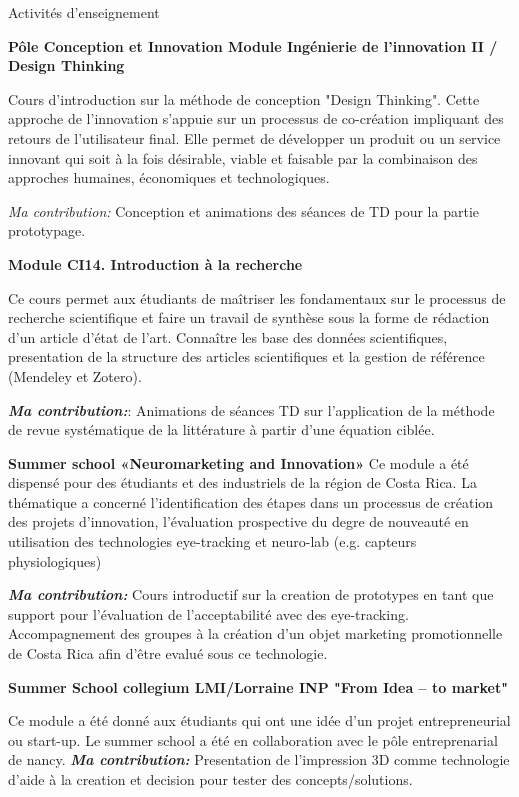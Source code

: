 \begin{rubric}{Activités d'enseignement}


\entry*[]\textbf{Pôle Conception et Innovation Module Ingénierie de l’innovation II / Design Thinking}

Cours d'introduction sur la méthode de conception "Design Thinking".  Cette approche de l'innovation s'appuie sur un processus de co-création impliquant des retours de l'utilisateur final.  Elle permet de développer un produit ou un service innovant qui soit à la fois désirable, viable et faisable par la combinaison des approches humaines, économiques et technologiques.

 \textit{Ma contribution:} Conception et animations des séances de TD pour la partie prototypage.

\entry*[]\textbf{Module CI14. Introduction à la recherche}

Ce cours permet aux étudiants  de maîtriser les  fondamentaux sur le processus de recherche scientifique et faire un travail de synthèse sous la forme de rédaction d'un article d'état de l'art. 
Connaître les base des données scientifiques, presentation de la structure des articles scientifiques et la gestion de référence (Mendeley et Zotero). 
  
\textit{\textbf{Ma contribution:}}: Animations de séances TD sur l'application de la méthode de revue systématique de la littérature  à partir d'une équation ciblée. 
  


\entry*[]\textbf{Summer school «Neuromarketing and Innovation»}
Ce module a été dispensé pour des étudiants et des industriels de la région de Costa Rica. 
La thématique a concerné l'identification des étapes dans un processus de création des projets d'innovation,  l'évaluation prospective du degre de nouveauté en utilisation des technologies eye-tracking et neuro-lab (e.g. capteurs physiologiques)

\textit{\textbf{Ma contribution:}} Cours introductif sur la creation de prototypes en tant que support pour l'évaluation de l'acceptabilité avec des eye-tracking. Accompagnement des groupes à la création d'un objet marketing promotionnelle de Costa Rica afin d'être evalué sous ce technologie. 
  

\entry*[]\textbf{Summer School collegium LMI/Lorraine INP "From Idea – to market"}

Ce module a été donné aux étudiants qui ont une idée  d'un projet entrepreneurial ou start-up. 
Le summer school a été en collaboration avec le pôle entreprenarial de nancy.
\textit{\textbf{Ma contribution:}} Presentation de l'impression 3D comme technologie d'aide à la creation et decision pour  tester des concepts/solutions. 



\end{rubric}
